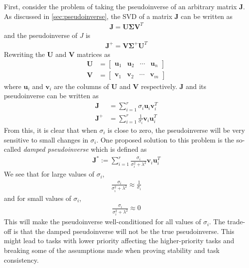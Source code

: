 First, consider the problem of taking the pseudoinverse of an arbitrary matrix $\bm{J}$.
As discussed in \autoref{sec:pseudoinverse}, the SVD of a matrix $\bm{J}$ can be
written as
\begin{align}
    \bm{J} = \bm{U} \bm{\Sigma} \bm{V}^T
\end{align}
and the pseudoinverse of $J$ is
\begin{align}
    \bm{J}^+ = \bm{V} \bm{\Sigma}^+ \bm{U}^T
\end{align}
Rewriting the $\bm{U}$ and $\bm{V}$ matrices as
\begin{subequations}
\begin{align}
    \bm{U} &= \begin{bmatrix} \bm{u}_1 & \bm{u}_2 & \cdots & \bm{u}_n \end{bmatrix} \\
    \bm{V} &= \begin{bmatrix} \bm{v}_1 & \bm{v}_2 & \cdots & \bm{v}_m \end{bmatrix}
\end{align}
\end{subequations}
where $\bm{u}_i$ and $\bm{v}_i$ are the columns of $\bm{U}$ and $\bm{V}$ respectively.
$\bm{J}$ and its pseudoinverse can be written as
\begin{subequations}
\begin{align}
    \bm{J} &= \sum_{i=1}^r \sigma_i \bm{u}_i \bm{v}_i^T \\
    \bm{J}^+ &= \sum_{i=1}^r \frac{1}{\sigma_i} \bm{v}_i \bm{u}_i^T
\end{align}
\end{subequations}
From this, it is clear that when $\sigma_i$ is close to zero, the pseudoinverse
will be very sensitive to small changes in $\sigma_i$. One proposed solution to
this problem is the so-called \emph{damped pseudoinverse} which is defined as
\begin{align}
    \bm{J}^* := \sum_{i=1}^r \frac{\sigma_i}{\sigma_i^2 + \lambda^2} \bm{v}_i \bm{u}_i^T
\end{align}
We see that for large values of $\sigma_i$,
\begin{align}
    \frac{\sigma_i}{\sigma_i^2 + \lambda^2} \approx \frac{1}{\sigma_i}
\end{align}
and for small values of $\sigma_i$,
\begin{align}
    \frac{\sigma_i}{\sigma_i^2 + \lambda^2} \approx 0
\end{align}
This will make the pseudoinverse well-conditioned for all values of $\sigma_i$.
The trade-off is that the damped pseudoinverse will not be the true pseudoinverse.
This might lead to tasks with lower priority affecting the higher-priority tasks and
breaking some of the assumptions made when proving stability and task consistency.

